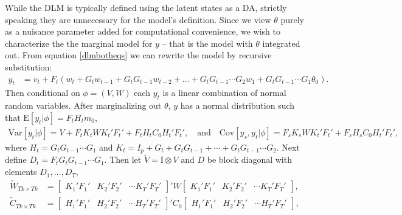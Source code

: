 \documentclass[12pt]{article}
\begin{document}
While the DLM is typically defined using the latent states as a DA, strictly speaking they are unnecessary for the model's definition. Since we view $\theta$ purely as a nuisance parameter added for computational convenience, we wish to characterize the the marginal model for $y$ -- that is the model with $\theta$ integrated out. From equation \eqref{dlmbotheqs} we can rewrite the model by recursive substitution:
\begin{align*}
  y_t &= v_t + F_t\left(w_t + G_tw_{t-1} + G_tG_{t-1}w_{t-2} + ... + G_tG_{t-1}\cdots G_{2}w_1 + G_tG_{t-1}\cdots G_1\theta_0\right).
\end{align*}
Then conditional on $\phi=(V,W)$ each $y_t$ is a linear combination of normal random variables. After marginalizing out $\theta$, $y$ has a normal distribution such that $\mathrm{E}[y_t|\phi] =  F_tH_tm_0$,
\begin{align*}
  \mathrm{Var}[y_t|\phi] =  V + F_tK_tWK_t'F_t' + F_tH_tC_0H_t'F_t',\quad \mathrm{and} \quad
  \mathrm{Cov}[y_s,y_t|\phi] = F_sK_sWK_t'F_t' + F_sH_sC_0H_t'F_t',
\end{align*}
where $H_t = G_tG_{t-1}\cdots G_1$ and $K_t = I_p + G_t + G_tG_{t-1} + \cdots + G_tG_{t-1}\cdots G_2$. Next define $D_t = F_tG_tG_{t-1}\cdots G_1$. Then let $\tilde{V}=\mathrm{I}\otimes V$ and $D$ be block diagonal with elements $D_1,\ldots,D_T$, 
\begin{align*}
\tilde{W}_{Tk\times Tk} &= \begin{bmatrix} K_1'F_1' & K_2'F_2' & \cdots K_T'F_T' \end{bmatrix}' W \begin{bmatrix} K_1'F_1' & K_2'F_2' & \cdots K_T'F_T' \end{bmatrix}, &\\
\tilde{C}_{Tk\times Tk} &= \begin{bmatrix} H_1'F_1' & H_2'F_2' & \cdots H_T'F_T' \end{bmatrix}' C_0 \begin{bmatrix} H_1'F_1' & H_2'F_2' & \cdots H_T'F_T' \end{bmatrix},&
\end{align*}
\end{document}
